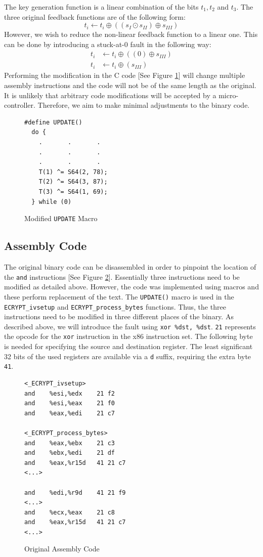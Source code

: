 \documentclass[conference]{IEEEtran}
\newcommand{\code}[1]{\texttt{#1}}
\begin{document}
The key generation function is a linear combination of the bits $t_1, t_2$ and $t_3$.
The three original feedback functions are of the following form: $$t_i \gets t_i \oplus ((s_I \odot s_{II}) \oplus s_{III})$$ However, we wish to reduce the non-linear feedback function to a linear one. This can be done by introducing a stuck-at-0 fault in the following way:
\begin{align*}
t_i &\gets t_i \oplus ((0) \oplus s_{III})\\
t_i &\gets t_i \oplus (s_{III})
\end{align*}
Performing the modification in the C code [See Figure \ref{modified-macro}] will change multiple assembly instructions and the code will not be of the same length as the original. It is unlikely that arbitrary code modifications will be accepted by a micro-controller. Therefore, we aim to make minimal adjustments to the binary code.
\begin{figure}[H]
\begin{lstlisting}[style=snippet, frame=tlrb]
#define UPDATE()
  do {
    .       .       .
    .       .       .
    .       .       .
    T(1) ^= S64(2, 78); 
    T(2) ^= S64(3, 87); 
    T(3) ^= S64(1, 69); 
  } while (0)
\end{lstlisting}
\caption{Modified \code{UPDATE} Macro}
\label{modified-macro}
\end{figure}

\subsection{Assembly Code}
The original binary code can be disassembled in order to pinpoint the location of the \code{and} instructions [See Figure \ref{fig:orgi-asm}].
Essentially three instructions need to be modified as detailed above. However, the code was implemented using macros and these perform replacement of the text. The \code{UPDATE()} macro is used in the \code{ECRYPT\_ivsetup} and \code{ECRYPT\_process\_bytes} functions. Thus, the three instructions need to be modified in three different places of the binary. As described above, we will introduce the fault using \code{xor \%dst, \%dst}. \code{21} represents the opcode for the \code{xor} instruction in the x86 instruction set. The following byte is needed for specifying the source and destination register. The least significant 32 bits of the used registers are available via a \code{d} suffix, requiring the extra byte \code{41}.
\begin{figure}[H]
\begin{lstlisting}[style=asm, frame=tlrb]
<_ECRYPT_ivsetup>
and    %esi,%edx    21 f2
and    %esi,%eax    21 f0
and    %eax,%edi    21 c7

<_ECRYPT_process_bytes>
and    %eax,%ebx    21 c3
and    %ebx,%edi    21 df  
and    %eax,%r15d   41 21 c7
<...>

and    %edi,%r9d    41 21 f9
<...>
and    %ecx,%eax    21 c8
and    %eax,%r15d   41 21 c7
<...>
\end{lstlisting}
\caption{Original Assembly Code}\label{fig:orgi-asm}
\end{figure}
\end{document}
